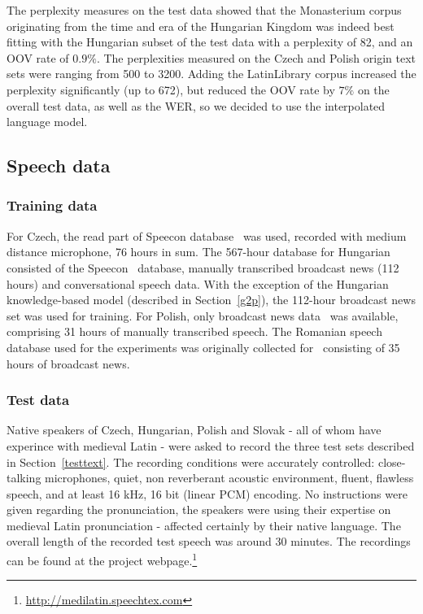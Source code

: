 \documentclass[runningheads,a4paper]{llncs}
\begin{document}
The perplexity measures on the test data showed that the Monasterium corpus originating from the time and era of the Hungarian Kingdom was indeed best fitting with the Hungarian subset of the test data with a perplexity of 82, and an OOV rate of $0.9\%$.
The perplexities measured on the Czech and Polish origin text sets were ranging from 500 to 3200.
Adding the LatinLibrary corpus increased the perplexity significantly (up to 672), but reduced the OOV rate by $7\%$ on the overall test data, as well as the WER, so we decided to use the interpolated language model.

\subsection{Speech data}
\subsubsection{Training data}\label{speechtraining}
For Czech, the read part of Speecon database~\cite{czech} was used, recorded with medium distance microphone, 76 hours in sum.
The 567-hour database for Hungarian consisted of the Speecon~\cite{hungarian} database, manually transcribed broadcast news (112 hours) and conversational speech data.
With the exception of the Hungarian knowledge-based model (described in Section~\ref{g2p}), the 112-hour broadcast news set was used for training.
For Polish, only broadcast news data~\cite{romanian} was available, comprising 31 hours of manually transcribed speech.
The Romanian speech database used for the experiments was originally collected for~\cite{romanian} consisting of 35 hours of broadcast news.
\subsubsection{Test data}
Native speakers of Czech, Hungarian, Polish and Slovak - all of whom have experince with medieval Latin - were asked to record the three test sets described in Section~\ref{testtext}.
The recording conditions were accurately controlled: close-talking microphones, quiet, non reverberant acoustic environment, fluent, flawless speech, and at least 16 kHz, 16 bit (linear PCM) encoding.
No instructions were given regarding the pronunciation, the speakers were using their expertise on medieval Latin pronunciation - affected certainly by their native language.
The overall length of the recorded test speech was around 30 minutes.
The recordings can be found at the project webpage.\footnote{\url{http://medilatin.speechtex.com}}
\end{document}
